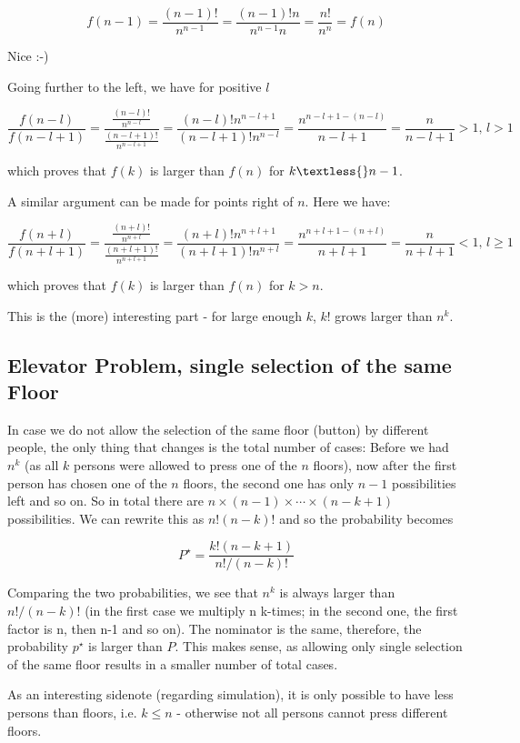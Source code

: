 \[
f(n-1) = \frac{(n-1)!}{n^{n-1}} = \frac{(n-1)! n }{n^{n-1} n } = \frac{n!}{n^{n}} = f(n)
\]

Nice :-)

Going further to the left, we have for positive $l$

\[
\frac{f(n-l)}{f(n-l+1)} = \frac{ \frac{(n-l)!}{n^{n-l}} }{ \frac{(n-l+1)!}{n^{n-l+1}} } = \frac{  (n-l)! n^{n-l+1}  }{ (n-l+1)! n^{n-l} } = \frac{n^{n-l+1-(n-l)}}{n-l+1} = \frac{n}{n-l+1} > 1, \, l > 1
\]

which proves that $f(k)$ is larger than $f(n)$ for $k\textless{}n-1$.

A similar argument can be made for points right of $n$. Here we have:

\[
\frac{f(n+l)}{f(n+l+1)} = \frac{ \frac{(n+l)!}{n^{n+l}} }{ \frac{(n+l+1)!}{n^{n+l+1}} } = \frac{  (n+l)! n^{n+l+1}  }{ (n+l+1)! n^{n+l} } = \frac{n^{n+l+1-(n+l)}}{n+l+1} = \frac{n}{n+l+1} < 1, \, l \geq 1
\]

which proves that $f(k)$ is larger than $f(n)$ for $k>n$.

This is the (more) interesting part - for large enough $k$, $k!$ grows larger than $n^k$.

\subsection{Elevator Problem, single selection of the same Floor}

In case we do not allow the selection of the same floor (button) by
different people, the only thing that changes is the total number of
cases: Before we had \(n^k\) (as all \(k\) persons were allowed to press one of the \(n\) floors), now after the first person has chosen one of the \(n\) floors, the second one has only \(n-1\) possibilities left and so on. So in total there are \(n \times (n-1) \times \cdots \times (n-k+1)\) possibilities. We can rewrite this as \(n!(n-k)!\) and so the probability becomes

\[
P^\star = \frac{k!(n-k+1)}{n!/(n-k)!}
\]

Comparing the two probabilities, we see that \(n^k\) is always larger
than \(n!/(n-k)!\) (in the first case we multiply n k-times; in the
second one, the first factor is n, then n-1 and so on). The nominator is the same, therefore, the probability \(p^\star\) is larger than \(P\). This makes sense, as allowing only single selection of the same floor results in a smaller number of total cases.

As an interesting sidenote (regarding simulation), it is only possible to have less persons than floors, i.e. \(k \leq n\) - otherwise not all persons cannot press different floors.
